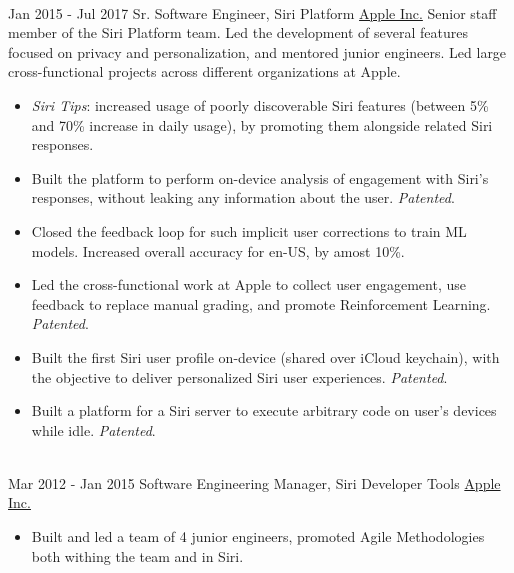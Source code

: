 \documentclass[letterpaper]{twentysecondcv} %
\begin{document}
\begin{twenty}
{{\begin{itemize}
        \end{itemize}}
        }
        {}
    \\
    \twentyitem
        {Jan 2015 -}
        {Jul 2017}
        {Sr. Software Engineer, Siri Platform}
        {\href{http://www.apple.com}{Apple Inc.}}
        {Senior staff member of the Siri Platform team. Led the development of several features focused on privacy and personalization, and mentored junior engineers. Led large cross-functional projects across different organizations at Apple.}
        {
        {\begin{itemize}
        \item \textit{Siri Tips}: increased usage of poorly discoverable Siri features (between 5\% and 70\% increase in daily usage), by promoting them alongside related Siri responses.
        \item Built the platform to perform on-device analysis of engagement with Siri's responses, without leaking any information about the user. \textit{Patented}.
        \item Closed the feedback loop for such implicit user corrections to train ML models. Increased overall accuracy for en-US, by amost 10\%.
        \item Led the cross-functional work at Apple to collect user engagement, use feedback to replace manual grading, and promote Reinforcement Learning. \textit{Patented}.
        \item Built the first Siri user profile on-device (shared over iCloud keychain), with the objective to deliver personalized Siri user experiences. \textit{Patented}.
        \item Built a platform for a Siri server to execute arbitrary code on user's devices while idle. \textit{Patented}.
        \end{itemize}}
        }
    \\
    \twentyitem
        {Mar 2012 -}
        {Jan 2015}
        {Software Engineering Manager, Siri Developer Tools}
        {\href{http://www.apple.com}{Apple Inc.}}
        {}
        {
        {\begin{itemize}
        \item Built and led a team of 4 junior engineers, promoted Agile Methodologies both withing the team and in Siri.

\end{itemize}}}
\end{twenty}
\end{document}
